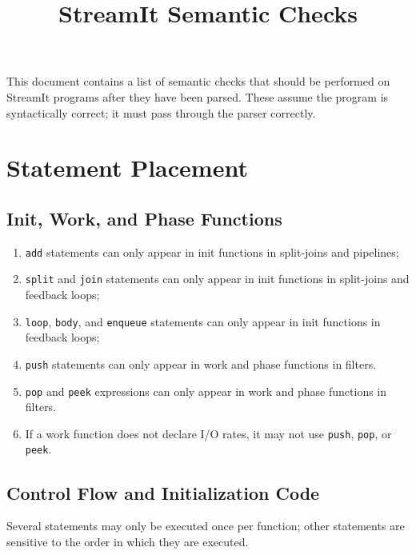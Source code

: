 \documentclass[11pt]{article}
\title{StreamIt Semantic Checks}
\begin{document}
\maketitle

This document contains a list of semantic checks that should be
performed on StreamIt programs after they have been parsed.  These
assume the program is syntactically correct; it must pass through the
parser correctly.

\section{Statement Placement}

\subsection{Init, Work, and Phase Functions}

\begin{enumerate}
\item \lstinline|add| statements can only appear in init functions in
  split-joins and pipelines;
\item \lstinline|split| and \lstinline|join| statements can only
  appear in init functions in split-joins and feedback loops;
\item \lstinline|loop|, \lstinline|body|, and \lstinline|enqueue|
  statements can only appear in init functions in feedback loops;
\item \lstinline|push| statements can only appear in work and phase
  functions in filters.
\item \lstinline|pop| and \lstinline|peek| expressions can only appear
  in work and phase functions in filters.
\item If a work function does not declare I/O rates, it may not use
  \lstinline|push|, \lstinline|pop|, or \lstinline|peek|.
\end{enumerate}

\subsection{Control Flow and Initialization Code}

Several statements may only be executed once per function; other
statements are sensitive to the order in which they are executed.
\end{document}
